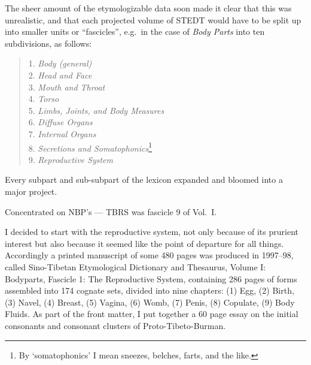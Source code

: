  The sheer amount of the etymologizable data soon made it clear that this was unrealistic, and that each projected volume of STEDT would have to be split up into smaller units or “fascicles”, e.g.\ in the case of \textit{Body Parts} into ten subdivisions, as follows:

\begin{quote}
{\footnotesize
1. \textit{Body (general)}\\
2. \textit{Head and Face}\\
3. \textit{Mouth and Throat}\\
4. \textit{Torso}\\
5. \textit{Limbs, Joints, and Body Measures}\\
6. \textit{Diffuse Organs}\\
7. \textit{Internal Organs}\\
8. \textit{Secretions and Somatophonics}\footnote{By ‘somatophonics’ I mean sneezes,
belches, farts, and the like.}\\
9. \textit{Reproductive System}\\
}
\end{quote}

Every subpart and sub-subpart of the lexicon expanded and bloomed into a major project.

Concentrated on NBP’s --- TBRS was fascicle 9 of Vol.~I.

I decided to start with the reproductive system, not only because of its prurient interest but also because it seemed like the point of departure for all things. Accordingly a printed manuscript of some 480 pages was produced in 1997–98, called Sino-Tibetan Etymological Dictionary and Thesaurus, Volume I: Bodyparts, Fascicle 1: The Reproductive System, containing 286 pages of forms assembled into 174 cognate sets, divided into nine chapters: (1) Egg, (2) Birth, (3) Navel, (4) Breast, (5) Vagina, (6) Womb, (7) Penis, (8) Copulate, (9) Body Fluids. As part of the front matter, I put together a 60 page essay on the initial consonants and consonant clusters of Proto-Tibeto-Burman.

